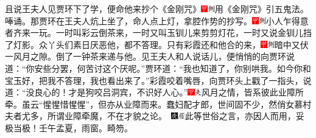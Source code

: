 且说王夫人见贾环下了学，便命他来抄个《金刚咒》{\includegraphics[width=3mm]{../Images/00002}\includegraphics[width=3mm]{../Images/00011}\footnotesize \kaishu 用《金刚咒》引五鬼法。}唪诵。那贾环在王夫人炕上坐了，命人点上灯，拿腔作势的抄写。{\includegraphics[width=3mm]{../Images/00002}\includegraphics[width=3mm]{../Images/00011}\footnotesize \kaishu 小人乍得意者齐来一玩。}一时叫彩云倒茶来，一时又叫玉钏儿来剪剪灯花，一时又说金钏儿挡了灯影。众丫头们素日厌恶他，都不答理。只有彩霞还和他合的来，{\includegraphics[width=3mm]{../Images/00002}\includegraphics[width=3mm]{../Images/00011}\footnotesize \kaishu 暗中又伏一风月之隙。}倒了一钟茶来递与他。见王夫人和人说话儿，便悄悄的向贾环说道：``你安些分罢，何苦讨这个厌呢。''贾环道：``我也知道了，你别哄我。如今你和宝玉好，把我不答理，我也看出来了。''彩霞咬着嘴唇，向贾环头上戳了一指头，说道：``没良心的！才是狗咬吕洞宾，不识好人心。''{\includegraphics[width=3mm]{../Images/00002}\includegraphics[width=3mm]{../Images/00012}\footnotesize \kaishu 风月之情，皆系彼此业障所牵。虽云``惺惺惜惺惺''，但亦从业障而来。蠢妇配才郎，世间固不少，然俏女慕村夫者尤多，所谓业障牵魔，不在才貌之论。　\includegraphics[width=3mm]{../Images/00004}\includegraphics[width=3mm]{../Images/00010}\footnotesize \kaishu 此等世俗之言，亦因人而用，妥极当极！壬午孟夏，雨窗。畸笏。}

